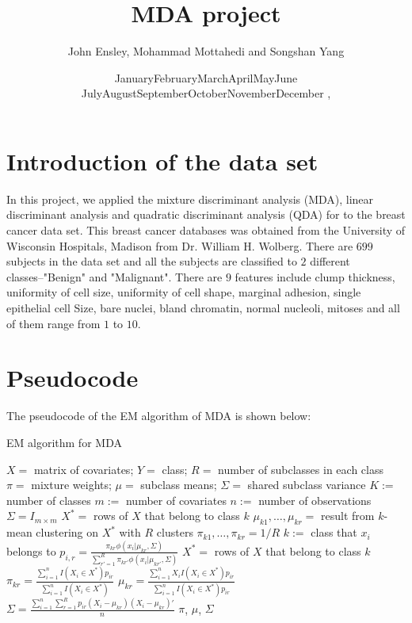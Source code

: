 \documentclass[12pt]{article}
\def\today{\ifcase\month\or
  January\or February\or March\or April\or May\or June\or
  July\or August\or September\or October\or November\or December\fi
  \space\number\day, \number\year}
\begin{document}
\renewcommand{\baselinestretch}{1.5}

\title{MDA project}
\author{John Ensley, Mohammad Mottahedi and Songshan Yang}

\date{\today}
\maketitle
\section{Introduction of the data set}

In this project, we applied the mixture discriminant analysis (MDA), linear discriminant analysis and quadratic discriminant analysis (QDA) for to the breast cancer data set. This breast cancer databases was obtained from the University of Wisconsin Hospitals, Madison from Dr. William H. Wolberg.
There are $699$ subjects in the data set and all the subjects are classified to $2$ different classes--"Benign" and "Malignant". There are $9$ features include clump thickness, uniformity of cell size, uniformity of cell shape, marginal adhesion, single epithelial cell Size, bare nuclei, bland chromatin, normal nucleoli, mitoses and all of them range from $1$ to $10$.

\section{Pseudocode}
The pseudocode of the EM algorithm of MDA is shown below:
\begin{algorithm}
	\caption{EM algorithm for MDA}
	\label{alg:1}
	\begin{algorithmic}
		\REQUIRE $X =$ matrix of covariates; $Y =$ class; $R =$ number of subclasses in each class
		\ENSURE $\pi =$ mixture weights; $\mu =$ subclass means; $\Sigma =$ shared subclass variance
		\STATE $K :=$ number of classes
		\STATE $m :=$ number of covariates
		\STATE $n :=$ number of observations
		\STATE $\Sigma = I_{m \times m}$
		\STATE $X^* =$ rows of $X$ that belong to class $k$
		\STATE $\mu_{k1},\dots,\mu_{kr} =$ result from $k$-mean clustering on $X^*$ with $R$ clusters
		\STATE $\pi_{k1},\dots,\pi_{kr} = 1/R$
		\ENDFOR
		\STATE $k :=$ class that $x_i$ belongs to
		\STATE $p_{i,r} = \frac{\pi_{kr} \phi(x_i|\mu_{kr},\Sigma)}{\sum_{r'=1}^R \pi_{kr'} \phi(x_i|\mu_{kr'},\Sigma)}$
		\ENDFOR
		\ENDFOR
		\STATE $X^* =$ rows of $X$ that belong to class $k$
		\STATE $\pi_{kr} = \frac{\sum_{i=1}^n I(X_i \in X^*)p_{ir}}{\sum_{i=1}^n I(X_i \in X^*)}$
		\STATE $\mu_{kr} = \frac{\sum_{i=1}^n X_i I(X_i \in X^*)p_{ir}}{\sum_{i=1}^n I(X_i \in X^*) p_{ir}}$
		\STATE $\Sigma = \frac{\sum_{i=1}^n \sum_{r=1}^R p_{ir}(X_i - \mu_{kr})(X_i - \mu_{kr})'}{n}$
		\ENDFOR
		\ENDFOR
		\ENDWHILE
		\RETURN $\pi$, $\mu$, $\Sigma$
	\end{algorithmic}
\end{algorithm}
\end{document}
